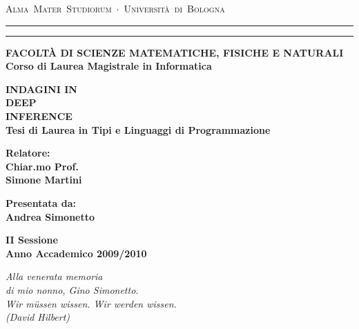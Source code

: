 \documentclass[12pt,a4paper,openright,twoside]{report}
\begin{document}
\begin{titlepage}
	\topmargin=0cm
	\begin{center}
		\mbox{{\large{\textsc{Alma Mater Studiorum $\cdot$ Universit\`a di Bologna}}}}
		\rule[0.1cm]{14.0cm}{0.1mm}
		\rule[0.5cm]{14.0cm}{0.6mm}
		{\small{\bf FACOLT\`A DI SCIENZE MATEMATICHE, FISICHE E NATURALI\\
		Corso di Laurea Magistrale in Informatica}}
	\end{center}
	\vspace{15mm}
	\begin{center}
		{\LARGE{\bf INDAGINI IN}}\\
		\vspace{3mm}
		{\LARGE{\bf DEEP}}\\
		\vspace{3mm}
		{\LARGE{\bf INFERENCE}}\\
		\vspace{19mm} {\large{\bf Tesi di Laurea in Tipi e Linguaggi di Programmazione}}
	\end{center}
	\vspace{40mm}\par\noindent
	\begin{minipage}[t]{0.52\textwidth}
		{\large{\bf Relatore:\\
		Chiar.mo Prof.\\
		Simone Martini}}
	\end{minipage}
	\hfill
	\begin{minipage}[t]{0.52\textwidth}\raggedleft
		{\large{\bf Presentata da:\\
		Andrea Simonetto}}
	\end{minipage}
	\vspace{20mm}
	\begin{center}
		{\large{\bf II Sessione\\
		Anno Accademico 2009/2010}}
	\end{center}
\end{titlepage}
\clearpage{\pagestyle{empty}\cleardoublepage}
\begin{titlepage}
	\thispagestyle{empty}
	\topmargin=5cm
	\raggedleft\large\emph{
		Alla venerata memoria \\
		di mio nonno, Gino Simonetto.} \\
	\vspace{3em}
	\raggedleft\large\emph{
		Wir m\"ussen wissen. Wir werden wissen. \\
		(David Hilbert)} \\
	\newpage
	\clearpage{\pagestyle{empty}\cleardoublepage}
\end{titlepage}
\end{document}
